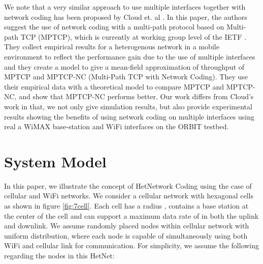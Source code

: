 \documentclass{sig-alternate-10pt}
\begin{document}
We note that a very similar approach  to use multiple interfaces together with network coding has been proposed by Cloud et. al \cite{cloud13multitcp}. In this paper, the authors suggest the use of   network coding with a multi-path protocol based on Multi-path TCP (MPTCP), which is  currently at working group level of the IETF \cite{ietfmptcp}.  They  collect empirical  results for a heterogenous network in a mobile environment to reflect the performance gain due to the use of multiple interfaces and they create a model to give a mean-field approximation of throughput of MPTCP and MPTCP-NC (Multi-Path TCP with Network Coding). They use their empirical data with a theoretical model to compare MPTCP and MPTCP-NC, and show that MPTCP-NC performs better. Our work differs from Cloud's work in that, we not only give simulation results, but also provide experimental results showing  the benefits of  using network coding on multiple interfaces using real a WiMAX base-station and WiFi interfaces on the ORBIT testbed.




\section{System Model}
In this paper, we illustrate the concept of HetNetwork Coding using the case of cellular and WiFi networks. We consider a cellular network with hexagonal cells  as shown in figure \ref{fig:7cell}.  Each cell  has a radius  ,  contains a base station at the center of the cell and can support a maximum data  rate of   in both the uplink and downlink. We assume  randomly placed nodes  within cellular network with uniform distribution, where each node is capable of simultaneously using both WiFi and cellular link for communication. For simplicity, we assume the following regarding the nodes in this HetNet:
\end{document}
